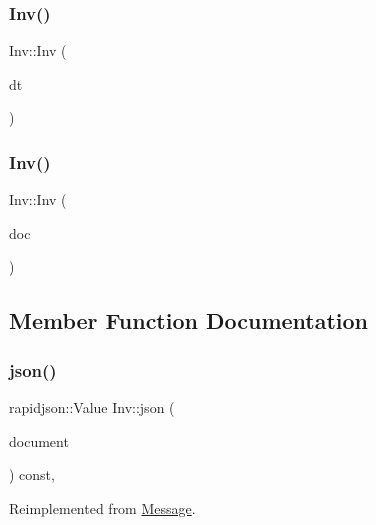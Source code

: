 \subsubsection{\texorpdfstring{Inv()}{Inv()}\hspace{0.1cm}{\footnotesize\ttfamily [1/2]}}
{\footnotesize\ttfamily Inv\+::\+Inv (\begin{DoxyParamCaption}\item[{\mbox{\hyperlink{structInvData}{Inv\+Data}}}]{dt }\end{DoxyParamCaption})\hspace{0.3cm}{\ttfamily [explicit]}}

\mbox{\label{classInv_a4b26ec79d84c931c4e09d0c1111c4f74}} 
\subsubsection{\texorpdfstring{Inv()}{Inv()}\hspace{0.1cm}{\footnotesize\ttfamily [2/2]}}
{\footnotesize\ttfamily Inv\+::\+Inv (\begin{DoxyParamCaption}\item[{rapidjson\+::\+Document $\ast$}]{doc }\end{DoxyParamCaption})\hspace{0.3cm}{\ttfamily [explicit]}}



\subsection{Member Function Documentation}
\mbox{\label{classInv_a815854f9808009dbf9f0fdb1159061c5}} 
\subsubsection{\texorpdfstring{json()}{json()}}
{\footnotesize\ttfamily rapidjson\+::\+Value Inv\+::json (\begin{DoxyParamCaption}\item[{rapidjson\+::\+Document $\ast$}]{document }\end{DoxyParamCaption}) const\hspace{0.3cm}{\ttfamily [override]}, {\ttfamily [virtual]}}



Reimplemented from \mbox{\hyperlink{classMessage_a6f8e3ac2eed3a8afe9400fcd5b3447b2}{Message}}.



